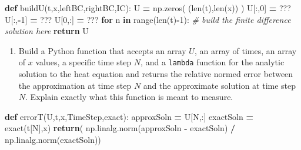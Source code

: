 \documentclass[
]{book}
\newenvironment{Shaded}{\begin{snugshade}}{\end{snugshade}}
\newcommand{\BuiltInTok}[1]{#1}
\newcommand{\CommentTok}[1]{\textcolor[rgb]{0.56,0.35,0.01}{\textit{#1}}}
\newcommand{\ControlFlowTok}[1]{\textcolor[rgb]{0.13,0.29,0.53}{\textbf{#1}}}
\newcommand{\DecValTok}[1]{\textcolor[rgb]{0.00,0.00,0.81}{#1}}
\newcommand{\KeywordTok}[1]{\textcolor[rgb]{0.13,0.29,0.53}{\textbf{#1}}}
\newcommand{\NormalTok}[1]{#1}
\newcommand{\OperatorTok}[1]{\textcolor[rgb]{0.81,0.36,0.00}{\textbf{#1}}}
\providecommand{\tightlist}{%
  \setlength{\itemsep}{0pt}\setlength{\parskip}{0pt}}
\theoremstyle{definition}
\theoremstyle{definition}
\theoremstyle{definition}
\theoremstyle{remark}
\begin{document}
\begin{Shaded}
\begin{Highlighting}[]
\KeywordTok{def}\NormalTok{ buildU(t,x,leftBC,rightBC,IC):}
\NormalTok{  U }\OperatorTok{=}\NormalTok{ np.zeros( (}\BuiltInTok{len}\NormalTok{(t),}\BuiltInTok{len}\NormalTok{(x)) )}
\NormalTok{  U[:,}\DecValTok{0}\NormalTok{] }\OperatorTok{=}\NormalTok{ ???}
\NormalTok{  U[:,}\OperatorTok{{-}}\DecValTok{1}\NormalTok{] }\OperatorTok{=}\NormalTok{ ???}
\NormalTok{  U[}\DecValTok{0}\NormalTok{,:] }\OperatorTok{=}\NormalTok{ ???}
  \ControlFlowTok{for}\NormalTok{ n }\KeywordTok{in} \BuiltInTok{range}\NormalTok{(}\BuiltInTok{len}\NormalTok{(t)}\OperatorTok{{-}}\DecValTok{1}\NormalTok{):}
    \CommentTok{\# build the finite difference solution here}
  \ControlFlowTok{return}\NormalTok{ U}
\end{Highlighting}
\end{Shaded}

\begin{enumerate}
\def\labelenumi{\alph{enumi}.}
\setcounter{enumi}{1}
\tightlist
\item
  Build a Python function that accepts an array \(U\), an array of times, an array of \(x\) values, a specific time step \(N\), and a \texttt{lambda} function for the analytic solution to the heat equation and returns the relative normed error between the approximation at time step \(N\) and the approximate solution at time step \(N\). Explain exactly what this function is meant to measure.
\end{enumerate}

\begin{Shaded}
\begin{Highlighting}[]
\KeywordTok{def}\NormalTok{ errorT(U,t,x,TimeStep,exact):}
\NormalTok{  approxSoln }\OperatorTok{=}\NormalTok{ U[N,:]}
\NormalTok{  exactSoln }\OperatorTok{=}\NormalTok{ exact(t[N],x)}
  \ControlFlowTok{return}\NormalTok{( np.linalg.norm(approxSoln }\OperatorTok{{-}}\NormalTok{ exactSoln) }\OperatorTok{/}\NormalTok{ np.linalg.norm(exactSoln))}
\end{Highlighting}
\end{Shaded}
\end{document}
